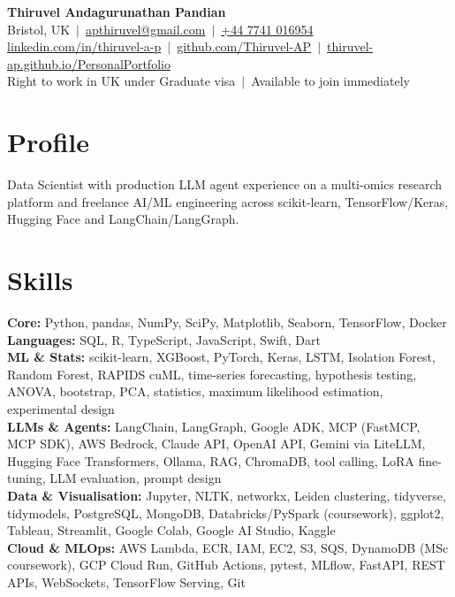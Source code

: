 \documentclass[a4paper,11pt]{article}
\begin{document}
\fontsize{11}{13.2}\selectfont

\begin{center}
  {\LARGE\bfseries Thiruvel Andagurunathan Pandian}\\[3pt]
  Bristol, UK \,$|$\, \href{mailto:apthiruvel@gmail.com}{apthiruvel@gmail.com} \,$|$\, \href{tel:+447741016954}{+44 7741 016954}\\[1pt]
\href{https://www.linkedin.com/in/thiruvel-a-p/}{linkedin.com/in/thiruvel-a-p} \,$|$\, \href{https://github.com/Thiruvel-AP}{github.com/Thiruvel-AP} \,$|$\, \href{https://thiruvel-ap.github.io/PersonalPortfolio/}{thiruvel-ap.github.io/PersonalPortfolio}\\[1pt]
  Right to work in UK under Graduate visa \,$|$\, Available to join immediately
\end{center}

\section{Profile}
Data Scientist with production LLM agent experience on a multi-omics research platform and freelance AI/ML engineering across scikit-learn, TensorFlow/Keras, Hugging Face and LangChain/LangGraph.

\section{Skills}
\textbf{Core:} Python, pandas, NumPy, SciPy, Matplotlib, Seaborn, TensorFlow, Docker\\[2pt]
\textbf{Languages:} SQL, R, TypeScript, JavaScript, Swift, Dart\\[2pt]
\textbf{ML \& Stats:} scikit-learn, XGBoost, PyTorch, Keras, LSTM, Isolation Forest, Random Forest, RAPIDS cuML, time-series forecasting, hypothesis testing, ANOVA, bootstrap, PCA, statistics, maximum likelihood estimation, experimental design\\[2pt]
\textbf{LLMs \& Agents:} LangChain, LangGraph, Google ADK, MCP (FastMCP, MCP SDK), AWS Bedrock, Claude API, OpenAI API, Gemini via LiteLLM, Hugging Face Transformers, Ollama, RAG, ChromaDB, tool calling, LoRA fine-tuning, LLM evaluation, prompt design\\[2pt]
\textbf{Data \& Visualisation:} Jupyter, NLTK, networkx, Leiden clustering, tidyverse, tidymodels, PostgreSQL, MongoDB, Databricks/PySpark (coursework), ggplot2, Tableau, Streamlit, Google Colab, Google AI Studio, Kaggle\\[2pt]
\textbf{Cloud \& MLOps:} AWS Lambda, ECR, IAM, EC2, S3, SQS, DynamoDB (MSc coursework), GCP Cloud Run, GitHub Actions, pytest, MLflow, FastAPI, REST APIs, WebSockets, TensorFlow Serving, Git
\end{document}
